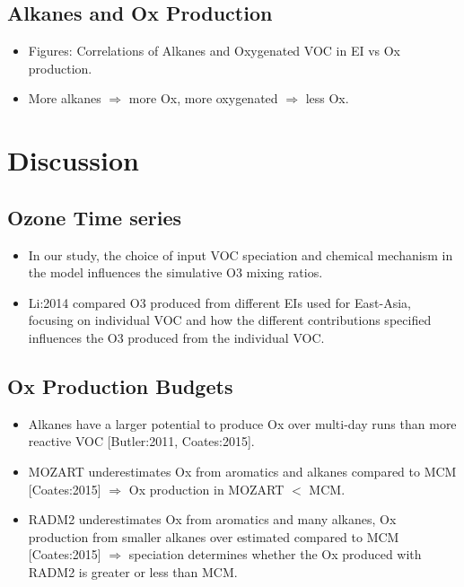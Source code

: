 \documentclass[14pt]{extarticle}
\begin{document}
\subsection{Alkanes and Ox Production}
\begin{itemize}
    \item Figures: Correlations of Alkanes and Oxygenated VOC in EI vs Ox production.
    \item More alkanes $\Rightarrow$ more Ox, more oxygenated $\Rightarrow$ less Ox.
\end{itemize}

\section{Discussion}

\subsection{Ozone Time series}
\begin{itemize}
    \item In our study, the choice of input VOC speciation and chemical mechanism in the model influences the simulative O3 mixing ratios.
    \item Li:2014 compared O3 produced from different EIs used for East-Asia, focusing on individual VOC and how the different contributions specified influences the O3 produced from the individual VOC.
\end{itemize}

\subsection{Ox Production Budgets}
\begin{itemize}
    \item Alkanes have a larger potential to produce Ox over multi-day runs than more reactive VOC [Butler:2011, Coates:2015].
    \item MOZART underestimates Ox from aromatics and alkanes compared to MCM [Coates:2015] $\Rightarrow$ Ox production in MOZART $<$ MCM.
    \item RADM2 underestimates Ox from aromatics and many alkanes, Ox production from smaller alkanes over estimated compared to MCM [Coates:2015] $\Rightarrow$ speciation determines whether the Ox produced with RADM2 is greater or less than MCM.
\end{itemize}
\end{document}
